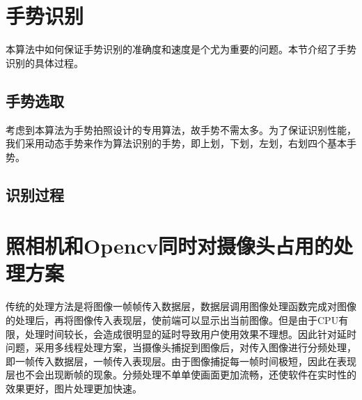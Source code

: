 \documentclass{XDBAthesis}
\begin{document}
\section{手势识别}
本算法中如何保证手势识别的准确度和速度是个尤为重要的问题。本节介绍了手势识别的具体过程。
\subsection{手势选取}
考虑到本算法为手势拍照设计的专用算法，故手势不需太多。为了保证识别性能，我们采用动态手势来作为算法识别的手势，即上划，下划，左划，右划四个基本手势。

\subsection{识别过程}


\section{照相机和Opencv同时对摄像头占用的处理方案}

    传统的处理方法是将图像一帧帧传入数据层，数据层调用图像处理函数完成对图像的处理后，再将图像传入表现层，使前端可以显示出当前图像。但是由于CPU有限，处理时间较长，会造成很明显的延时导致用户使用效果不理想。因此针对延时问题，采用多线程处理方案，当摄像头捕捉到图像后，对传入图像进行分频处理，即一帧传入数据层，一帧传入表现层。由于图像捕捉每一帧时间极短，因此在表现层也不会出现断帧的现象。分频处理不单单使画面更加流畅，还使软件在实时性的效果更好，图片处理更加快速。


\ifx\allfiles\undefined
%

\end{document}
